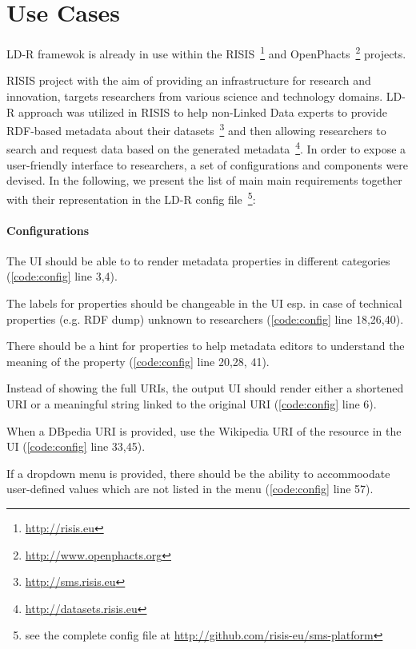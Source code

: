 \documentclass{acm_proc_article-sp}
\begin{document}
\section{Use Cases}

LD-R framewok is already in use within the RISIS~\footnote{\url{http://risis.eu}} and OpenPhacts~\footnote{\url{http://www.openphacts.org}} projects.

RISIS project with the aim of providing an infrastructure for research and innovation, targets researchers from various science and technology domains.
LD-R approach was utilized in RISIS to help non-Linked Data experts to provide RDF-based metadata about their datasets~\footnote{\url{http://sms.risis.eu}} and then allowing researchers to search and request data based on the generated metadata~\footnote{\url{http://datasets.risis.eu}}.
In order to expose a user-friendly interface to researchers, a set of configurations and components were devised. 
In the following, we present the list of main main requirements together with their representation in the LD-R config file~\footnote{see the complete config file at \url{http://github.com/risis-eu/sms-platform}}:

\paragraph{Configurations}
\begin{compactitem}
 \item The UI should be able to to render metadata properties in different categories (\autoref{code:config} line 3,4).
 \item The labels for properties should be changeable in the UI esp. in case of technical properties (e.g. RDF dump) unknown to researchers (\autoref{code:config} line 18,26,40).
 \item There should be a hint for properties to help metadata editors to understand the meaning of the property (\autoref{code:config} line 20,28, 41).
 \item Instead of showing the full URIs, the output UI should render either a shortened URI or a meaningful string linked to the original URI (\autoref{code:config} line 6). 
 \item When a DBpedia URI is provided, use the Wikipedia URI of the resource in the UI (\autoref{code:config} line 33,45).
 \item If a dropdown menu is provided, there should be the ability to accommoodate user-defined values which are not listed in the menu (\autoref{code:config} line 57).
 
\end{compactitem}
\end{document}
